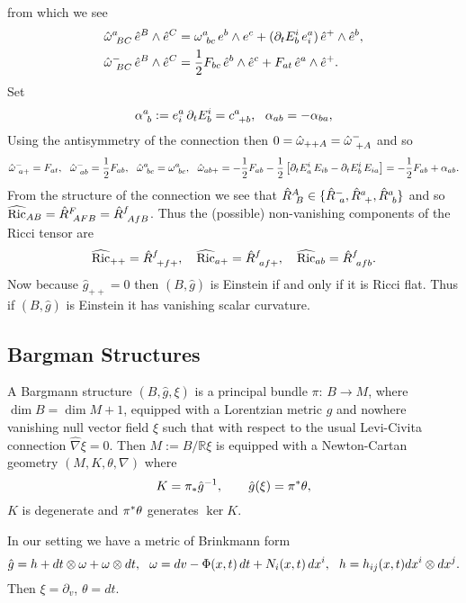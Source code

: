 \documentclass{article}
\begin{document}
from which we see
\begin{align*}
\hat \omega\sp{a}_{\ B C}\, {\hat e}\sp{B}\wedge {\hat e}\sp{C}&=
\omega\sp{a}_{\ bc}\, e\sp{b}\wedge e\sp{c}+(\partial_t E\sp{i}_b\, { e}\sp{a}_{i} )\,  {\hat e}\sp{+}\wedge
{\hat e}\sp{b},\\
\hat \omega\sp{-}_{\ B C}\, {\hat e}\sp{B}\wedge {\hat e}\sp{C}&=
\frac12 F_{bc}\, {\hat e}\sp{b}\wedge {\hat e}\sp{c} +F_{at}\, {\hat e}\sp{a}\wedge {\hat e}\sp{+}.
\end{align*}
Set
$$\alpha\sp{a}_{\ b}:= { e}\sp{a}_{i} \,\partial_t E\sp{i}_b=c\sp{a}_{\ +b},\ \
\alpha_{ab}=-\alpha_{ba}, $$
Using the antisymmetry of the connection then $0=\hat\omega_{++A}=\hat\omega\sp{-}_{\ +A}$
and so
$$\hat\omega\sp{-}_{\ a+}= F_{at},\ \  \hat\omega\sp{-}_{\ ab}= \frac12 F_{ab},\ \
\hat\omega\sp{a}_{\ bc}=\omega\sp{a}_{\ bc}, \ \
\hat\omega_{a b+}=-\frac12 F_{a b} -\frac12\left[ \partial_t E\sp{i}_a \,E_{ib}
-  \partial_t E\sp{i}_b \,E_{ia}  \right]=-\frac12 F_{a b}+\alpha_{ab}.
$$
From the structure of the connection we see that $\hat R\sp{A}_{\ B}\in\{\hat R\sp{-}_{\ a}, 
\hat R\sp{a}_{\ +}, \hat R\sp{a}_{\ b} \}$ and so $\widehat {\operatorname{Ric}}_{AB}=\hat R\sp{F}_{\ AFB}=
\hat R\sp{f}_{\ AfB}$. Thus the (possible) non-vanishing components of the Ricci tensor
are
$$\widehat {\operatorname{Ric}}_{++}=\hat R\sp{f}_{\ +f+},\quad 
\widehat {\operatorname{Ric}}_{a+}=\hat R\sp{f}_{\ af+},\quad 
\widehat {\operatorname{Ric}}_{ab}=\hat R\sp{f}_{\ afb}.
$$
Now because $\hat g_{++}=0$ then $(B, \hat g)$ is Einstein if and only if it is Ricci flat. Thus if
$(B, \hat g)$ is Einstein it has vanishing scalar curvature.


\subsection{Bargman Structures}
A Bargmann structure $(B, \hat g, \xi)$ is a principal bundle $\pi:\, B\rightarrow M$, where $\dim B=\dim M+1$,
equipped with a Lorentzian metric $\hat g$ and nowhere vanishing null vector field $\xi$ such that with respect to the usual Levi-Civita connection $\hat \nabla \xi=0$. Then $M:=B/\mathbb{R}\xi$ is equipped with
a Newton-Cartan geometry $(M, K, \theta, \nabla)$ where
$$ K=\pi_\ast {\hat g}\sp{-1}, \qquad \hat g(\xi)=\pi\sp\ast\theta,$$
$K$ is degenerate and $\pi\sp\ast\theta$ generates $\ker K$.

In our setting we have a metric of Brinkmann form
$$\hat g= h + dt\otimes \omega+\omega\otimes dt,\ \
\omega= dv -\Phi(x,t)\, dt+ N_i(x,t)\, dx\sp{i}, \ \  h=h_{ij}(x,t) dx\sp{i}\otimes dx\sp{j}.
$$
Then $\xi =\partial_v$, $\theta=dt$.
\end{document}

